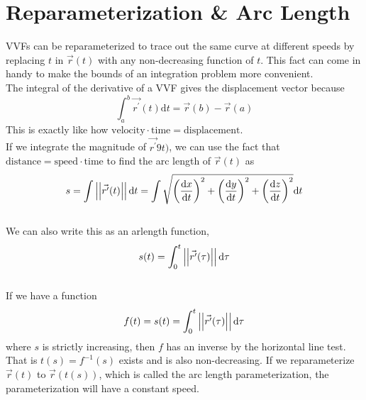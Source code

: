 \section{Reparameterization \& Arc Length}
\noindent
VVFs can be reparameterized to trace out the same curve at different speeds by replacing $t$ in $\vec{r}(t)$ with any non-decreasing function of $t$. This fact can come in handy to make the bounds of an integration problem more convenient.\\

\noindent
The integral of the derivative of a VVF gives the displacement vector because						$$\int_{a}^{b}{\vec{r^\prime}(t)\mathrm{d}t}=\vec{r}(b)-\vec{r}(a)$$
This is exactly like how $\text{velocity}\cdot\text{time}=\text{displacement}$.\\

\noindent
If we integrate the magnitude of $\vec{r^\prime}9t)$, we can use the fact that $\text{distance}=\text{speed}\cdot\text{time}$ to find the arc length of $\vec{r}(t)$ as $$s=\int{\left|\left|\vec{r^\prime}(t)\right|\right|\mathrm{d}t}=\int{\sqrt{\left(\frac{\mathrm{d}x}{\mathrm{d}t}\right)^2+\left(\frac{\mathrm{d}y}{\mathrm{d}t}\right)^2+\left(\frac{\mathrm{d}z}{\mathrm{d}t}\right)^2}\mathrm{d}t}$$\\
We can also write this as an arlength function, $$s(t)=\int_{0}^{t}{\left|\left|\vec{r^{\prime}}(\tau)\right|\right|\mathrm{d}\tau}$$\\

\noindent
If we have a function $$f(t)=s(t)=\int_{0}^{t}{\left|\left|\vec{r^{\prime}}(\tau)\right|\right|\mathrm{d}\tau}$$ 
where $s$ is strictly increasing, then $f$ has an inverse by the horizontal line test. That is $t(s)=f^{-1}(s)$ exists and is also non-decreasing. If we reparameterize $\vec{r}(t)$ to $\vec{r}(t(s))$, which is called the arc length parameterization, the parameterization will have a constant speed.